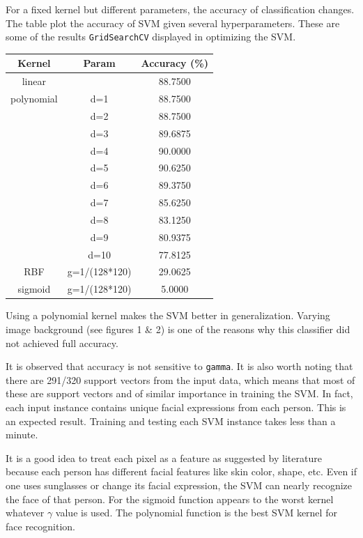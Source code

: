 \documentclass[11pt,a4paper]{article}
\newcommand{\head}[1]{\textnormal{\textbf{#1}}}
\begin{document}
	For a fixed kernel but different parameters, the accuracy of classification changes. The table plot the accuracy of SVM given several hyperparameters. These are some of the results \texttt{GridSearchCV} displayed in optimizing the SVM.
	\begin{center}
	\begin{tabular}{c|c|c}
		\hline
		\head{Kernel} & \head{Param} & \head{Accuracy} (\%)\\
		\hline
		linear & & 88.7500 \\
		polynomial & d=1  & 88.7500 \\
		 & d=2  & 88.7500 \\
		 & d=3  & 89.6875 \\
		 & d=4  & 90.0000 \\
		 & d=5 & 90.6250 \\
		 & d=6  & 89.3750 \\
		 & d=7  & 85.6250 \\
		 & d=8 & 83.1250 \\
		 & d=9  & 80.9375 \\
		 & d=10 & 77.8125 \\
		RBF & g=1/(128*120)  & 29.0625 \\
		sigmoid & g=1/(128*120)  & 5.0000
	\end{tabular}
	\end{center}
	
	Using a polynomial kernel makes the SVM better in generalization. Varying image background (see figures 1 \& 2) is one of the reasons why this classifier did not achieved full accuracy.
	
	It is observed that accuracy is not sensitive to \texttt{gamma}. It is also worth noting that there are 291/320 support vectors from the input data, which means that most of these are support vectors and of similar importance in training the SVM. In fact, each input instance contains unique facial expressions from each person. This is an expected result. Training and testing each SVM instance takes less than a minute.
	
	It is a good idea to treat each pixel as a feature as suggested by literature because each person has different facial features like skin color, shape, etc. Even if one uses sunglasses or change its facial expression, the SVM can nearly recognize the face of that person.
	For the sigmoid function appears to the worst kernel whatever $\gamma$ value is used. The polynomial function is the best SVM kernel for face recognition.
	
\end{document}
